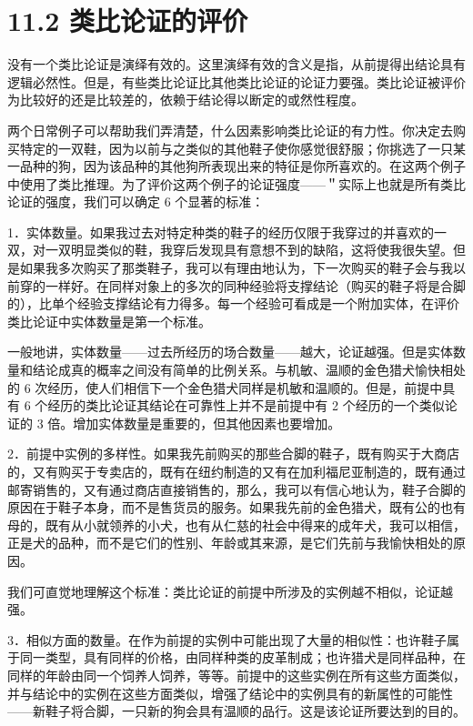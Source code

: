 \section*{11.2 类比论证的评价}
没有一个类比论证是演绎有效的。这里演绎有效的含义是指，从前提得出结论具有逻辑必然性。但是，有些类比论证比其他类比论证的论证力要强。类比论证被评价为比较好的还是比较差的，依赖于结论得以断定的或然性程度。

两个日常例子可以帮助我们弄清楚，什么因素影响类比论证的有力性。你决定去购买特定的一双鞋，因为以前与之类似的其他鞋子使你感觉很舒服；你挑选了一只某一品种的狗，因为该品种的其他狗所表现出来的特征是你所喜欢的。在这两个例子中使用了类比推理。为了评价这两个例子的论证强度——＂实际上也就是所有类比论证的强度，我们可以确定 6 个显著的标准：

1．实体数量。如果我过去对特定种类的鞋子的经历仅限于我穿过的并喜欢的一双，对一双明显类似的鞋，我穿后发现具有意想不到的缺陷，这将使我很失望。但是如果我多次购买了那类鞋子，我可以有理由地认为，下一次购买的鞋子会与我以前穿的一样好。在同样对象上的多次的同种经验将支撑结论（购买的鞋子将是合脚的），比单个经验支撑结论有力得多。每一个经验可看成是一个附加实体，在评价类比论证中实体数量是第一个标准。

一般地讲，实体数量——过去所经历的场合数量——越大，论证越强。但是实体数量和结论成真的概率之间没有简单的比例关系。与机敏、温顺的金色猎犬愉快相处的 6 次经历，使人们相信下一个金色猎犬同样是机敏和温顺的。但是，前提中具有 6 个经历的类比论证其结论在可靠性上并不是前提中有 2 个经历的一个类似论证的 3 倍。增加实体数量是重要的，但其他因素也要增加。

2．前提中实例的多样性。如果我先前购买的那些合脚的鞋子，既有购买于大商店的，又有购买于专卖店的，既有在纽约制造的又有在加利福尼亚制造的，既有通过邮寄销售的，又有通过商店直接销售的，那么，我可以有信心地认为，鞋子合脚的原因在于鞋子本身，而不是售货员的服务。如果我先前的金色猎犬，既有公的也有母的，既有从小就领养的小犬，也有从仁慈的社会中得来的成年犬，我可以相信，正是犬的品种，而不是它们的性别、年龄或其来源，是它们先前与我愉快相处的原因。

我们可直觉地理解这个标准：类比论证的前提中所涉及的实例越不相似，论证越强。

3．相似方面的数量。在作为前提的实例中可能出现了大量的相似性：也许鞋子属于同一类型，具有同样的价格，由同样种类的皮革制成；也许猎犬是同样品种，在同样的年龄由同一个饲养人饲养，等等。前提中的这些实例在所有这些方面类似，并与结论中的实例在这些方面类似，增强了结论中的实例具有的新属性的可能性——新鞋子将合脚，一只新的狗会具有温顺的品行。这是该论证所要达到的目的。

